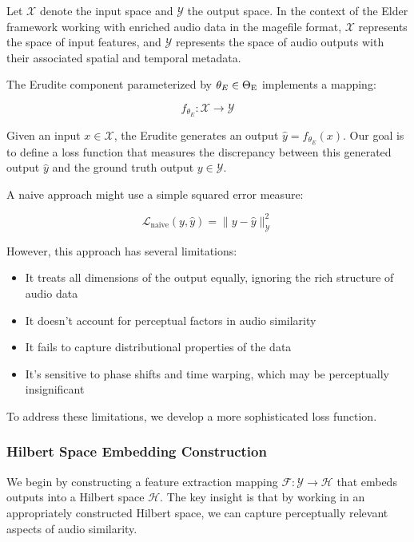 Let $\mathcal{X}$ denote the input space and $\mathcal{Y}$ the output space. In the context of the Elder framework working with enriched audio data in the magefile format, $\mathcal{X}$ represents the space of input features, and $\mathcal{Y}$ represents the space of audio outputs with their associated spatial and temporal metadata.

The Erudite component parameterized by $\theta_E \in \Theta_{\text{E}}$ implements a mapping:

\begin{equation}
f_{\theta_E}: \mathcal{X} \rightarrow \mathcal{Y}
\end{equation}

Given an input $x \in \mathcal{X}$, the Erudite generates an output $\hat{y} = f_{\theta_E}(x)$. Our goal is to define a loss function that measures the discrepancy between this generated output $\hat{y}$ and the ground truth output $y \in \mathcal{Y}$.

A naive approach might use a simple squared error measure:

\begin{equation}
\mathcal{L}_{\text{naive}}(y, \hat{y}) = \|y - \hat{y}\|_{\mathcal{Y}}^2
\end{equation}

However, this approach has several limitations:

\begin{itemize}
\item It treats all dimensions of the output equally, ignoring the rich structure of audio data
\item It doesn't account for perceptual factors in audio similarity
\item It fails to capture distributional properties of the data
\item It's sensitive to phase shifts and time warping, which may be perceptually insignificant
\end{itemize}

To address these limitations, we develop a more sophisticated loss function.

\subsubsection{Hilbert Space Embedding Construction}

We begin by constructing a feature extraction mapping $\mathcal{F}: \mathcal{Y} \rightarrow \mathcal{H}$ that embeds outputs into a Hilbert space $\mathcal{H}$. The key insight is that by working in an appropriately constructed Hilbert space, we can capture perceptually relevant aspects of audio similarity.

